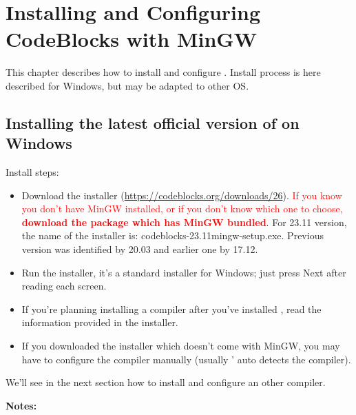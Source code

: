 \chapter{Installing and Configuring CodeBlocks with MinGW}\label{sec:install_codeblocks}

This chapter describes how to install and configure \codeblocks. Install process is here described for Windows, but may be adapted to other OS.

\section{Installing the latest official version of \codeblocks on Windows}
Install steps:
\begin{itemize}
\item Download the \codeblocks installer (\url{https://codeblocks.org/downloads/26}). \textcolor{red}{If you know you don't have MinGW installed, or if you don't know which one to choose, \textbf{download the package which has MinGW bundled}}. For 23.11 version, the name of the installer is: codeblocks-23.11mingw-setup.exe. Previous version was identified by 20.03 and earlier one by 17.12.
\item Run the installer, it's a standard installer for Windows; just press Next after reading each screen.
\item If you're planning installing a compiler after you've installed \codeblocks, read the information provided in the installer.
\item If you downloaded the installer which doesn't come with MinGW, you may have to configure the compiler manually (usually \codeblocks' auto detects the compiler).
\end{itemize}

We'll see in the next section how to install and configure an other compiler.

\textbf{Notes:}

